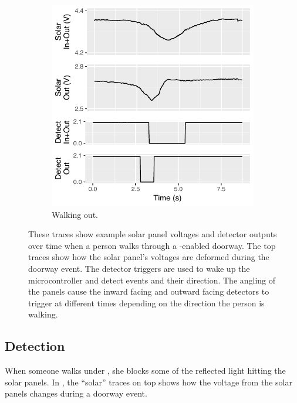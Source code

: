 \begin{figure}[t]
\begin{subfigure}[b]{0.5\textwidth}
		\includegraphics[width=\columnwidth]{figs/tracesout.pdf}
		\caption{Walking out.}
		\label{fig:tracesout}
	\end{subfigure}
	\caption{These traces show example solar panel voltages and detector outputs over time when a person walks through a \sysname-enabled doorway. The top traces show how the solar panel's voltages are deformed during the doorway event. The detector triggers are used to wake up the microcontroller and detect events and their direction. The angling of the panels cause the inward facing and outward facing detectors to trigger at different times depending on the direction the person is walking.\label{fig:traces}}
\end{figure}

\subsection{Detection}
\label{sec:detection}




When someone walks under \sysname, she blocks some of the reflected light hitting the solar panels.
In , the ``solar'' traces on top shows how the voltage from the solar panels changes during a doorway event.

